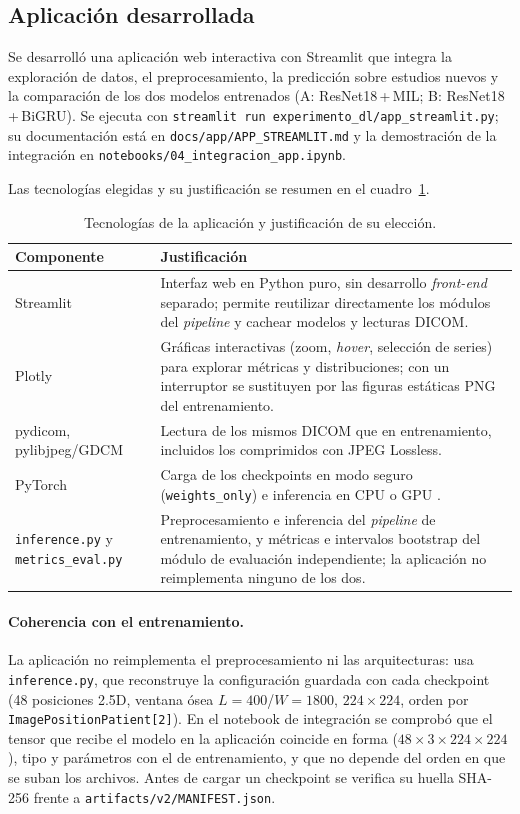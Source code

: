 \subsection{Aplicaci\'on desarrollada}\label{sec:app}
Se desarroll\'o una aplicaci\'on web interactiva con Streamlit que integra la exploraci\'on de datos, el preprocesamiento, la predicci\'on sobre estudios nuevos y la comparaci\'on de los dos modelos entrenados (A: ResNet18\,+\,MIL; B: ResNet18\,+\,BiGRU). Se ejecuta con \texttt{streamlit run experimento\_dl/app\_streamlit.py}; su documentaci\'on est\'a en \texttt{docs/app/APP\_STREAMLIT.md} y la demostraci\'on de la integraci\'on en \texttt{notebooks/04\_integracion\_app.ipynb}.

Las tecnolog\'ias elegidas y su justificaci\'on se resumen en el cuadro~\ref{tab:app-tec}.
\begin{table}[H]\centering\small
\begin{tabular}{p{3cm}p{10.5cm}}\toprule
Componente & Justificaci\'on \\\midrule
Streamlit & Interfaz web en Python puro, sin desarrollo \emph{front-end} separado; permite reutilizar directamente los m\'odulos del \emph{pipeline} y cachear modelos y lecturas DICOM. \\
Plotly & Gr\'aficas interactivas (zoom, \emph{hover}, selecci\'on de series) para explorar m\'etricas y distribuciones; con un interruptor se sustituyen por las figuras est\'aticas PNG del entrenamiento. \\
pydicom, pylibjpeg/GDCM & Lectura de los mismos DICOM que en entrenamiento, incluidos los comprimidos con JPEG Lossless. \\
PyTorch & Carga de los checkpoints en modo seguro (\texttt{weights\_only}) e inferencia en CPU o GPU \citep{paszke2019pytorch}. \\
\texttt{inference.py} y \texttt{metrics\_eval.py} & Preprocesamiento e inferencia del \emph{pipeline} de entrenamiento, y m\'etricas e intervalos bootstrap del m\'odulo de evaluaci\'on independiente; la aplicaci\'on no reimplementa ninguno de los dos. \\\bottomrule
\end{tabular}
\caption{Tecnolog\'ias de la aplicaci\'on y justificaci\'on de su elecci\'on.}\label{tab:app-tec}
\end{table}

\paragraph{Coherencia con el entrenamiento.} La aplicaci\'on no reimplementa el preprocesamiento ni las arquitecturas: usa \texttt{inference.py}, que reconstruye la configuraci\'on guardada con cada checkpoint (48 posiciones 2.5D, ventana \'osea $L=400$/$W=1800$, $224\times224$, orden por \texttt{ImagePositionPatient[2]}). En el notebook de integraci\'on se comprob\'o que el tensor que recibe el modelo en la aplicaci\'on coincide en forma ($48\times3\times224\times224$), tipo y par\'ametros con el de entrenamiento, y que no depende del orden en que se suban los archivos. Antes de cargar un checkpoint se verifica su huella SHA-256 frente a \texttt{artifacts/v2/MANIFEST.json}.

